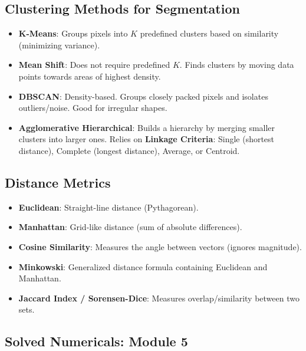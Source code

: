 \documentclass[11pt,a4paper]{article}
\begin{document}
\subsection{Clustering Methods for Segmentation}
\begin{itemize}
    \item \textbf{K-Means}: Groups pixels into $K$ predefined clusters based on similarity (minimizing variance).
    \item \textbf{Mean Shift}: Does not require predefined $K$. Finds clusters by moving data points towards areas of highest density.
    \item \textbf{DBSCAN}: Density-based. Groups closely packed pixels and isolates outliers/noise. Good for irregular shapes.
    \item \textbf{Agglomerative Hierarchical}: Builds a hierarchy by merging smaller clusters into larger ones. Relies on \textbf{Linkage Criteria}: Single (shortest distance), Complete (longest distance), Average, or Centroid.
\end{itemize}

\subsection{Distance Metrics}
\begin{itemize}
    \item \textbf{Euclidean}: Straight-line distance (Pythagorean).
    \item \textbf{Manhattan}: Grid-like distance (sum of absolute differences).
    \item \textbf{Cosine Similarity}: Measures the angle between vectors (ignores magnitude).
    \item \textbf{Minkowski}: Generalized distance formula containing Euclidean and Manhattan.
    \item \textbf{Jaccard Index / Sorensen-Dice}: Measures overlap/similarity between two sets.
\end{itemize}

\subsection{Solved Numericals: Module 5}
\end{document}
